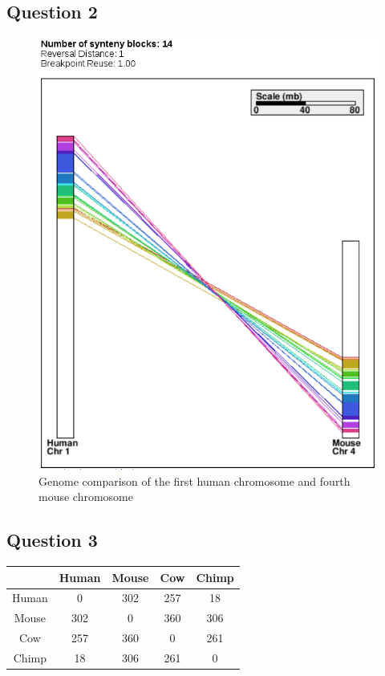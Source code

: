\documentclass[]{article}
\begin{document}
\subsection{Question 2}

\begin{figure}[h]
	\includegraphics*[width = \linewidth]{../H1_M4.png}
	\caption{\label{h1_m4} Genome comparison of the first human chromosome and fourth mouse chromosome }
\end{figure}
\subsection{Question 3}

\begin{tabular}{|*{5}{c|}}
	\hline
	   & Human  & Mouse  & Cow  & Chimp \\
	\hline
	Human  & 0  & 302  & 257  & 18 \\
	\hline
	Mouse  & 302  & 0  & 360 & 306 \\
	\hline
	Cow  & 257  & 360 & 0 & 261 \\
	\hline
	Chimp  & 18 & 306 & 261 & 0 \\
	\hline
	
\end{tabular}
\end{document}
